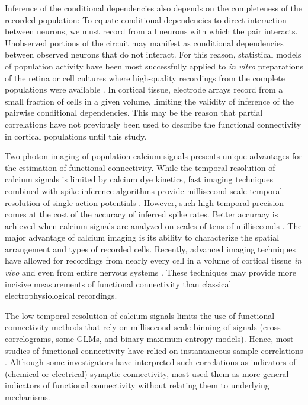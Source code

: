 \documentclass[10pt]{article}
\begin{document}
Inference of the conditional dependencies also depends on the completeness of the recorded population:  To equate conditional dependencies to direct interaction between neurons, we must record from all neurons with which the pair interacts. Unobserved portions of the circuit may manifest as conditional dependencies between observed neurons that do not interact. For this reason, statistical models of population activity have been most successfully applied to \emph{in vitro} preparations of the retina or cell cultures where high-quality recordings from the complete populations were available \cite{Pillow:2008}. In cortical tissue, electrode arrays record from a small fraction of cells in a given volume, limiting the validity of inference of the pairwise conditional dependencies. This may be the reason that partial correlations have not previously been used to describe the functional connectivity in cortical populations until this study.

Two-photon imaging of population calcium signals presents unique advantages for the estimation of functional connectivity.  While the temporal resolution of calcium signals is limited by calcium dye kinetics, fast imaging techniques combined with spike inference algorithms provide millisecond-scale temporal resolution of single action potentials \cite{Grewe:2010}. However, such high temporal precision comes at the cost of the accuracy of inferred spike rates.  Better accuracy is achieved when calcium signals are analyzed on scales of tens of milliseconds \cite{Cotton:2013}.  The major advantage of calcium imaging is its ability to characterize the spatial arrangement and types of recorded cells.  Recently, advanced imaging techniques have allowed for recordings from nearly every cell in a volume of cortical tissue  \emph{in vivo} \cite{Katona:2012, Cotton:2013} and even from entire nervous systems \cite{Leung:2013, Ahrens:2013}.  These techniques may provide more incisive measurements of functional connectivity than classical electrophysiological recordings.  

The low temporal resolution of calcium signals limits the use of functional connectivity methods that rely on millisecond-scale binning of signals (cross-correlograms, some GLMs, and binary maximum entropy models).  Hence, most studies of functional connectivity have relied on instantaneous sample correlations \cite{Greenberg:2008, Golshani:2009, Hofer:2011, Malmersjo:2013} .  Although some investigators have interpreted such correlations as indicators of (chemical or electrical) synaptic connectivity, most used them as more general indicators of functional connectivity without relating them to underlying mechanisms. 
\end{document}
